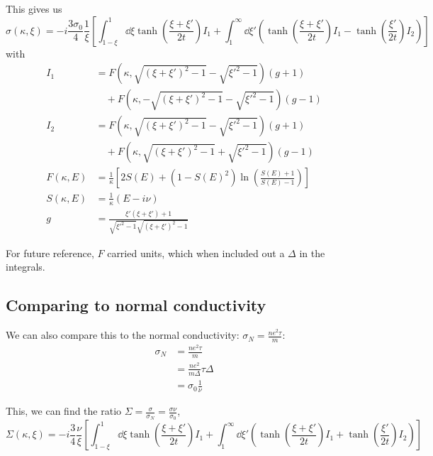 \documentclass[../../main.tex]{subfiles}
\begin{document}
This gives us 
\begin{equation}
\sigma(\kappa, \xi) = -i \frac{3 \sigma_0}{4} \frac{1}{\xi}\left[\int_{1 - \xi}^{1}\dd{\xi} \tanh(\frac{\xi + \xi'}{2 t}) I_1 + \int_{1}^{\infty} \dd{\xi'} \left( \tanh(\frac{\xi + \xi'}{2t}) I_1  - \tanh(\frac{\xi'}{2t})I_2 \right) \right]
\end{equation}
with 
\begin{align}
I_1 &= F(\kappa, \sqrt{(\xi + \xi')^2 - 1} - \sqrt{\xi'^2 - 1}) (g + 1) \nonumber\\
&\quad + F(\kappa, -\sqrt{(\xi + \xi')^2 - 1} - \sqrt{\xi'^2 - 1}) (g - 1) \\
I_2 &= F(\kappa, \sqrt{(\xi + \xi')^2 - 1} - \sqrt{\xi'^2 - 1}) (g + 1) \nonumber\\
&\quad + F(\kappa, \sqrt{(\xi + \xi')^2 - 1} + \sqrt{\xi'^2 - 1}) (g - 1) \\	
F(\kappa, E) &= \frac{1}{\kappa} \left[2 S(E) + (1 - S(E)^2)\ln(\frac{S(E) + 1}{S(E) - 1})\right]  \\
S(\kappa, E) &= \frac{1}{\kappa} \left(E - i \nu \right) \\
g  &= \frac{\xi' \left( \xi + \xi'\right) + 1}{\sqrt{\xi'^2 - 1}\sqrt{(\xi + \xi')^2 - 1}}
\end{align}

For future reference, $F$ carried units, which when included out a $\Delta$ in the integrals.

\subsection{Comparing to normal conductivity} \label{subsec:NamForm.NormalConductivity}
We can also compare this to the normal conductivity: $\sigma_N = \frac{n e^2 \tau}{m}$:
\begin{align}
\sigma_N &= \frac{n e^2 \tau}{m} \\
&= \frac{n e^2}{m \Delta} \tau \Delta \\
&= \sigma_0 \frac{1}{\nu}
\end{align}

This, we can find the ratio $\Sigma = \frac{\sigma}{\sigma_N} = \frac{\sigma \nu}{\sigma_0}$,
\begin{equation}
\Sigma(\kappa, \xi) = -i \frac{3}{4} \frac{\nu}{\xi}\left[\int_{1 - \xi}^{1}\dd{\xi} \tanh(\frac{\xi + \xi'}{2 t}) I_1 + \int_{1}^{\infty} \dd{\xi'} \left( \tanh(\frac{\xi + \xi'}{2t}) I_1  + \tanh(\frac{\xi'}{2t})I_2 \right) \right]
\end{equation}
\end{document}
